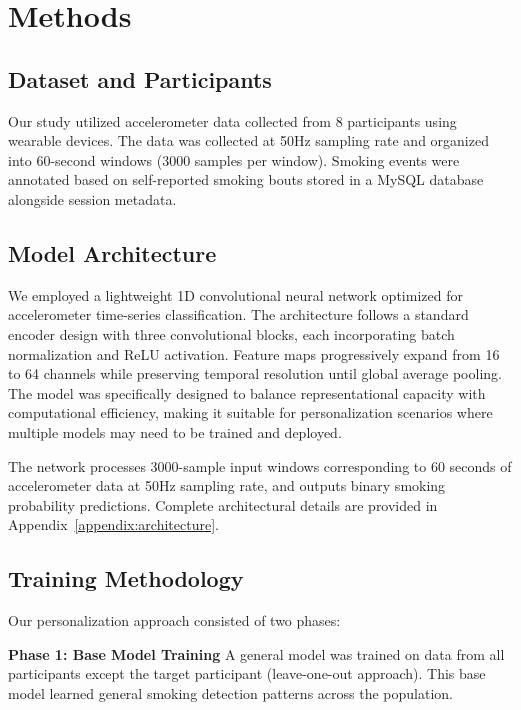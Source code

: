 \documentclass[11pt]{article}
\begin{document}
\section{Methods}
\label{sec:methods}


\subsection{Dataset and Participants}

Our study utilized accelerometer data collected from 8 participants using wearable devices. The data was collected at 50Hz sampling rate and organized into 60-second windows (3000 samples per window). Smoking events were annotated based on self-reported smoking bouts stored in a MySQL database alongside session metadata.

\subsection{Model Architecture}

We employed a lightweight 1D convolutional neural network optimized for accelerometer time-series classification. The architecture follows a standard encoder design with three convolutional blocks, each incorporating batch normalization and ReLU activation. Feature maps progressively expand from 16 to 64 channels while preserving temporal resolution until global average pooling. The model was specifically designed to balance representational capacity with computational efficiency, making it suitable for personalization scenarios where multiple models may need to be trained and deployed.

The network processes 3000-sample input windows corresponding to 60 seconds of accelerometer data at 50Hz sampling rate, and outputs binary smoking probability predictions. Complete architectural details are provided in Appendix~\ref{appendix:architecture}.

\subsection{Training Methodology}

Our personalization approach consisted of two phases:

\textbf{Phase 1: Base Model Training}
A general model was trained on data from all participants except the target participant (leave-one-out approach). This base model learned general smoking detection patterns across the population.
\end{document}
